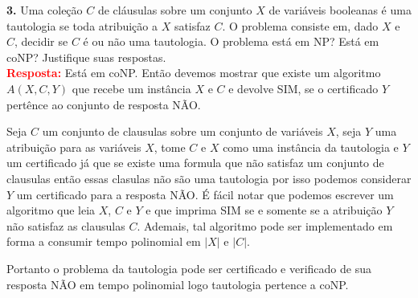 
\noindent\textbf{3.} Uma coleção $C$ de cláusulas sobre um conjunto $X$ de 
variáveis booleanas é uma tautologia se toda atribuição a $X$ satisfaz $C$. O 
problema  consiste em, dado $X$ e $C$, decidir se $C$ é ou não 
uma tautologia. O problema  está em NP? Está em coNP? 
Justifique suas respostas.\\[6pt]
\textcolor{red}{\textbf{Resposta:}} Está em coNP. Então devemos mostrar que 
existe um algoritmo  $A(X,C,Y)$ que recebe um instância $X$ e $C$ e devolve 
SIM, se o certificado $Y$ pertênce ao conjunto de resposta NÃO.

Seja $C$ um conjunto de clausulas sobre um conjunto de variáveis $X$, seja $Y$ 
uma atribuição para as variáveis $X$, tome $C$ e $X$ como uma instância da 
tautologia e $Y$ um certificado já que se existe uma formula que não satisfaz 
um conjunto de clausulas então essas clasulas não são uma tautologia por isso 
podemos considerar $Y$ um certificado para a resposta NÃO. É fácil notar que 
podemos escrever um algoritmo que leia $X$, $C$ e $Y$ e que imprima SIM se e 
somente se a atribuição $Y$ não satisfaz as clausulas $C$. Ademais, tal 
algoritmo pode ser implementado em forma a consumir tempo polinomial em $|X|$ e 
$|C|$.

Portanto o problema da tautologia pode ser certificado e verificado 
de sua resposta NÃO em tempo polinomial logo tautologia pertence a coNP.\\[6pt]